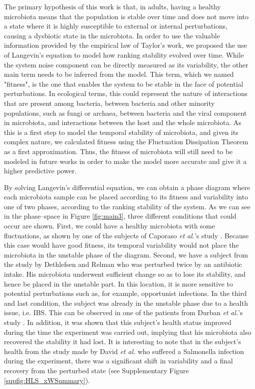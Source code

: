 The primary hypothesis of this work is that, in adults, having a healthy microbiota means that the population is stable over time and does not move into a state where it is highly susceptible to external or internal perturbations, causing a dysbiotic state in the microbiota. In order to use the valuable information provided by the empirical law of Taylor's work, we proposed the use of Langevin's equation to model how ranking stability evolved over time. While the system noise component can be directly measured as its variability, the other main term needs to be inferred from the model. This term, which we named "fitness", is the one that enables the system to be stable in the face of potential perturbations. In ecological terms, this could represent the nature of interactions that are present among bacteria, between bacteria and other minority populations, such as fungi or archaea, between bacteria and the viral component in microbiota, and interactions between the host and the whole microbiota. As this is a first step to model the temporal stability of microbiota, and given its complex nature, we calculated fitness using the Fluctuation Dissipation Theorem as a first approximation\cite{FD}. Thus, the fitness of microbiota will still need to be modeled in future works in order to make the model more accurate and give it a higher predictive power. 

By solving Langevin's differential equation, we can obtain a phase diagram where each microbiota sample can be placed according to its fitness and variability into one of two phases, according to the ranking stability of the system. As we can see in the phase--space in Figure \ref{fig:main3}, three different conditions that could occur are shown. First, we could have a healthy microbiota with some fluctuations, as shown by one of the subjects of Caporaso \emph{et al.}'s study \cite{moving}. Because this case would have good fitness, its temporal variability would not place the microbiota in the unstable phase of the diagram. Second, we have a subject from the study by Dethlefsen and Relman \cite{antibiotic} who was perturbed twice by an antibiotic intake. His microbiota underwent sufficient change so as to lose its stability, and hence be placed in the unstable part. In this location, it is more sensitive to potential perturbations such as, for example, opportunist infections. In the third and last condition, the subject was already in the unstable phase due to a health issue, i.e. IBS. This can be observed in one of the patients from Durban \emph{et al.}'s study \cite{IBS}. In addition, it was shown that this subject's health status improved during the time the experiment was carried out, implying that his microbiota also recovered the stability it had lost. It is interesting to note that in the subject's health from the study made by David \emph{et al.} \cite{hostlife} who suffered a Salmonella infection during the experiment, there was a significant shift in variability and a final recovery from the perturbed state (see Supplementary Figure  \ref{supfig:HLS_xWSummary}).

